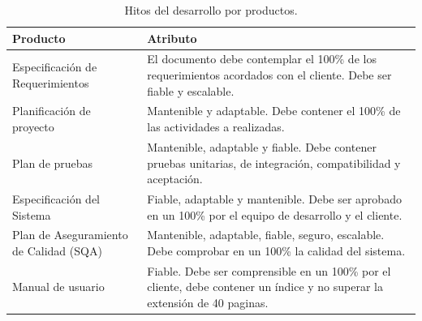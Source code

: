 \begin{table}[H]
    \caption[Hitos del desarrollo por productos.] {Hitos del desarrollo por productos.}
    \label{tbl:Objetivos Cuantificales y atributos de calidad por productos}
    \begin{tabular}{|p{}|p{}|}
        \hline
        \textbf{Producto} &  \textbf{Atributo}\\
    	\hline
    	\hline
    	Especificación de Requerimientos  & El documento debe contemplar el 100\% de los requerimientos acordados con el cliente. Debe ser fiable y escalable. \\ \hline
    	Planificación de proyecto & Mantenible y adaptable. Debe contener el 100\% de las actividades a realizadas. \\ \hline
    	Plan de pruebas & Mantenible, adaptable y fiable. Debe contener pruebas unitarias, de integración, compatibilidad y aceptación. \\ \hline
    	Especificación del Sistema & Fiable, adaptable y mantenible. Debe ser aprobado en un 100\% por el equipo de desarrollo y el cliente. \\ \hline
    	Plan de Aseguramiento de Calidad (SQA)  & Mantenible, adaptable, fiable, seguro, escalable. Debe comprobar en un 100\% la calidad del sistema.  \\ \hline
    	Manual de usuario & Fiable. Debe ser comprensible en un 100\% por el cliente, debe contener un índice y no superar la extensión de 40 paginas.  \\ 
        \hline
    \end{tabular}
\end{table}

